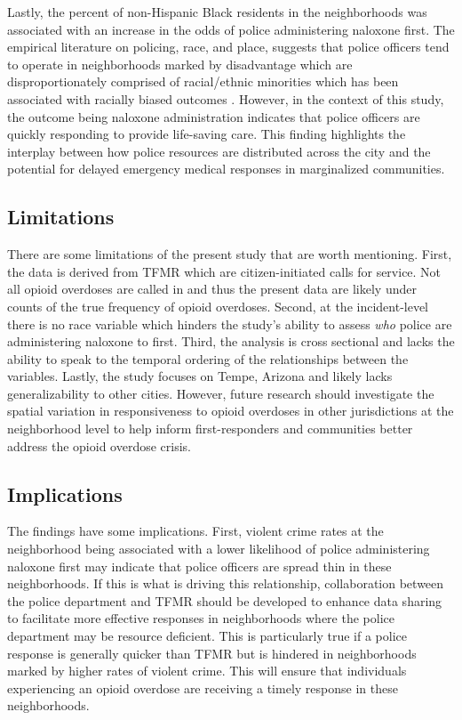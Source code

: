 Lastly, the percent of non-Hispanic Black residents in the neighborhoods was associated with an increase in the odds of police administering naloxone first. The empirical literature on policing, race, and place, suggests that police officers tend to operate in neighborhoods marked by disadvantage which are disproportionately comprised of racial/ethnic minorities which has been associated with racially biased outcomes \parencite{fagan_street_2000}. However, in the context of this study, the outcome being naloxone administration indicates that police officers are quickly responding to provide life-saving care. This finding highlights the interplay between how police resources are distributed across the city and the potential for delayed emergency medical responses in marginalized communities. 

\subsection{Limitations}
There are some limitations of the present study that are worth mentioning. First, the data is derived from TFMR which are citizen-initiated calls for service. Not all opioid overdoses are called in and thus the present data are likely under counts of the true frequency of opioid overdoses. Second, at the incident-level there is no race variable which hinders the study's ability to assess \textit{who} police are administering naloxone to first. Third, the analysis is cross sectional and lacks the ability to speak to the temporal ordering of the relationships between the variables. Lastly, the study focuses on Tempe, Arizona and likely lacks generalizability to other cities. However, future research should investigate the spatial variation in responsiveness to opioid overdoses in other jurisdictions at the neighborhood level to help inform first-responders and communities better address the opioid overdose crisis.

\subsection{Implications}

The findings have some implications. First, violent crime rates at the neighborhood being associated with a lower likelihood of police administering naloxone first may indicate that police officers are spread thin in these neighborhoods. If this is what is driving this relationship, collaboration between the police department and TFMR should be developed to enhance data sharing to facilitate more effective responses in neighborhoods where the police department may be resource deficient. This is particularly true if a police response is generally quicker than TFMR but is hindered in neighborhoods marked by higher rates of violent crime. This will ensure that individuals experiencing an opioid overdose are receiving a timely response in these neighborhoods. 

